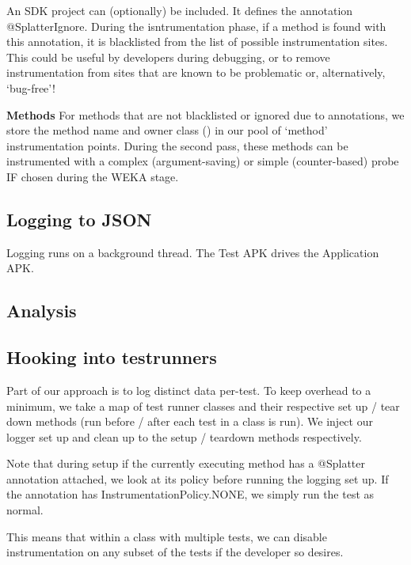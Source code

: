 An SDK project can (optionally) be included. It defines the annotation @SplatterIgnore. During the isntrumentation phase, if a method is found with this annotation, it is blacklisted from the list of possible instrumentation sites. This could be useful by developers during debugging, or to remove instrumentation from sites that are known to be problematic or, alternatively, {\lq}bug-free{\rq}!

\textbf{Methods}
For methods that are not blacklisted or ignored due to annotations, we store the method name and owner class () in our pool of {\lq}method{\rq} instrumentation points. During the second pass, these methods can be instrumented with a complex (argument-saving) or simple (counter-based) probe IF chosen during the WEKA stage.

\subsection{Logging to JSON}

Logging runs on a background thread. The Test APK drives the Application APK.

\subsection{Analysis}


\subsection{Hooking into testrunners}

Part of our approach is to log distinct data per-test. To keep overhead to a minimum, we take a map of test runner classes and their respective set up / tear down methods (run before / after each test in a class is run). We inject our logger set up and clean up to the setup / teardown methods respectively.

Note that during setup if the currently executing method has a @Splatter annotation attached, we look at its policy before running the logging set up. If the annotation has InstrumentationPolicy.NONE, we simply run the test as normal.

This means that within a class with multiple tests, we can disable instrumentation on any subset of the tests if the developer so desires.

